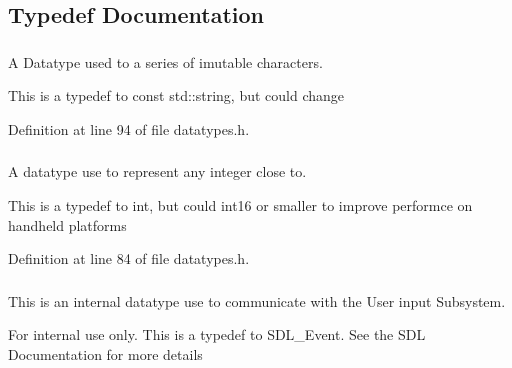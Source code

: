 \subsection{Typedef Documentation}
\hypertarget{namespacephys_a5ce5049f8b4bf88d6413c47b504ebb31}{
\subsubsection[{ConstString}]{}}
\label{df/dec/namespacephys_a5ce5049f8b4bf88d6413c47b504ebb31}


A Datatype used to a series of imutable characters. 

This is a typedef to const std::string, but could change 

Definition at line 94 of file datatypes.h.

\hypertarget{namespacephys_a7f09bf5585b2bb97613cd9aad4273a81}{
\subsubsection[{Integer}]{}}
\label{df/dec/namespacephys_a7f09bf5585b2bb97613cd9aad4273a81}


A datatype use to represent any integer close to. 

This is a typedef to int, but could int16 or smaller to improve performce on handheld platforms 

Definition at line 84 of file datatypes.h.

\hypertarget{namespacephys_a8126d26e4507e66d09876988bb941fd4}{
\subsubsection[{RawEvent}]{}}
\label{df/dec/namespacephys_a8126d26e4507e66d09876988bb941fd4}


This is an internal datatype use to communicate with the User input Subsystem. 

\begin{DoxyInternal}{For internal use only.}
This is a typedef to SDL\_\-Event. See the SDL Documentation for more details \end{DoxyInternal}


